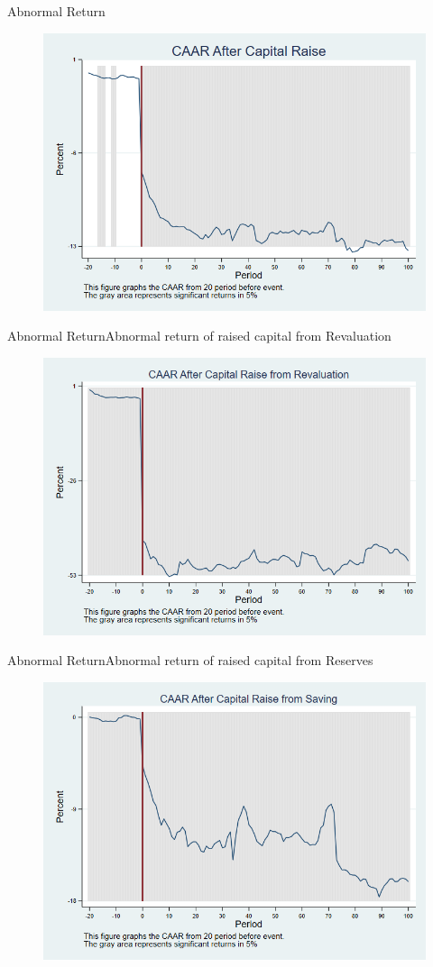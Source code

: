 \documentclass{beamer}
\begin{document}
\begin{frame}{Abnormal Return}
	\label{car_industry}
	\begin{figure}
		\centering
		\includegraphics[width=0.7\linewidth]{Output/car_industry.png}
		\label{fig:car_industry}
	\end{figure}
\end{frame}

\begin{frame}{Abnormal Return}{Abnormal return of raised capital from Revaluation}
	\label{car_industryRevaluation}
	\begin{figure}
		\centering
		\includegraphics[width=0.65\linewidth]{Output/car_industryRevaluation.png}
		\label{fig:car_industryRevaluation}
	\end{figure}
\end{frame}


\begin{frame}{Abnormal Return}{Abnormal return of raised capital from Reserves}
	\label{car_industrySaving}
	\begin{figure}
		\centering
		\includegraphics[width=0.65\linewidth]{Output/car_industrySaving.png}
		\label{fig:car_industrySaving}
	\end{figure}
\end{frame}
\end{document}

